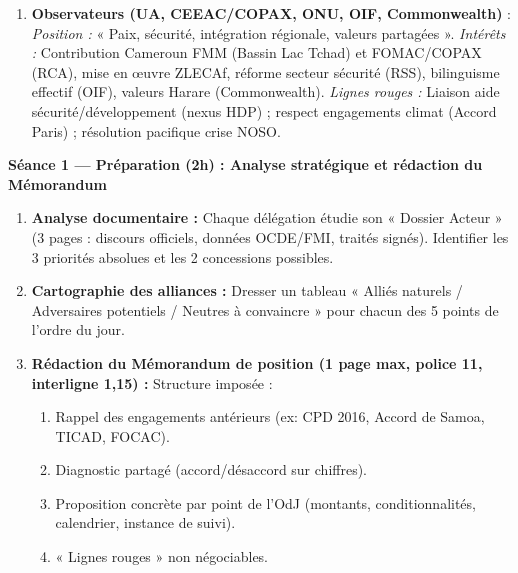 \documentclass[11pt]{article}
\newcommand{\cle}[1]{{\popxbold\color{popdark}#1}}
\newcounter{popsec}
\newcounter{popsub}
\newcommand{\courssub}[1]{%
  \stepcounter{popsub}%
  \par\vspace{9pt}\noindent{\popxbold\fontsize{11.5}{13}\selectfont\color{popink}{\color{poporange}\thepopsec.\thepopsub}\hspace{6pt}#1}\par\nopagebreak\vspace{4pt}
}
\begin{document}
\begin{enumerate}
    \item \textbf{Observateurs (UA, CEEAC/COPAX, ONU, OIF, Commonwealth)} : \textit{Position :} « Paix, sécurité, intégration régionale, valeurs partagées ». \textit{Intérêts :} Contribution Cameroun FMM (Bassin Lac Tchad) et FOMAC/COPAX (RCA), mise en œuvre ZLECAf, réforme secteur sécurité (RSS), bilinguisme effectif (OIF), valeurs Harare (Commonwealth). \textit{Lignes rouges :} Liaison aide sécurité/développement (nexus HDP) ; respect engagements climat (Accord Paris) ; résolution pacifique crise NOSO.
\end{enumerate}

\courssub{Consignes}
\textbf{Séance 1 — Préparation (2h) : Analyse stratégique et rédaction du Mémorandum}
\begin{enumerate}
    \item \textbf{Analyse documentaire :} Chaque délégation étudie son « Dossier Acteur » (3 pages : discours officiels, données OCDE/FMI, traités signés). Identifier les \cle{3 priorités absolues} et les \cle{2 concessions possibles}.
    \item \textbf{Cartographie des alliances :} Dresser un tableau « Alliés naturels / Adversaires potentiels / Neutres à convaincre » pour chacun des 5 points de l'ordre du jour.
    \item \textbf{Rédaction du Mémorandum de position (1 page max, police 11, interligne 1,15) :} Structure imposée :
    \begin{enumerate}
        \item Rappel des engagements antérieurs (ex: CPD 2016, Accord de Samoa, TICAD, FOCAC).
        \item Diagnostic partagé (accord/désaccord sur chiffres).
        \item Proposition concrète par point de l'OdJ (montants, conditionnalités, calendrier, instance de suivi).
        \item « Lignes rouges » non négociables.
    \end{enumerate}
\end{enumerate}
\end{document}
